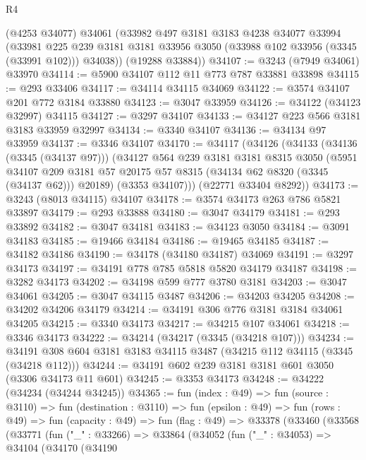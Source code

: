 \begin{lexlean}{R4}
\begin{coremodule}
      (@4253 @34077)
      @34061
      (@33982
        @497
        @3181
        @3183
        @4238
        @34077
        @33994
        (@33981
          @225
          @239
          @3181
          @3181
          @33956
          @3050
          (@33988 @102 @33956 (@3345 (@33991 @102)))
          @34038))
      (@19288 @33884))
@34107 := @3243 (@7949 @34061) @33970
@34114 := @5900 @34107 @112 @11 @773 @787 @33881 @33898
@34115 := @293 @33406
@34117 := @34114 @34115 @34069
@34122 := @3574 @34107 @201 @772 @3184 @33880
@34123 := @3047 @33959
@34126 := @34122 (@34123 @32997) @34115
@34127 := @3297 @34107
@34133 := @34127 @223 @566 @3181 @3183 @33959 @32997
@34134 := @3340 @34107
@34136 := @34134 @97 @33959
@34137 := @3346 @34107
@34170 := @34117
    (@34126
      (@34133
        (@34136 (@3345 (@34137 @97)))
        (@34127
          @564
          @239
          @3181
          @3181
          @8315
          @3050
          (@5951
            @34107
            @209
            @3181
            @57
            @20175
            @57
            @8315
            (@34134 @62 @8320 (@3345 (@34137 @62)))
            @20189)
          (@3353 @34107)))
      (@22771 @33404 @8292))
@34173 := @3243 (@8013 @34115) @34107
@34178 := @3574 @34173 @263 @786 @5821 @33897
@34179 := @293 @33888
@34180 := @3047 @34179
@34181 := @293 @33892
@34182 := @3047 @34181
@34183 := @34123 @3050
@34184 := @3091 @34183
@34185 := @19466 @34184
@34186 := @19465 @34185
@34187 := @34182 @34186
@34190 := @34178 (@34180 @34187) @34069
@34191 := @3297 @34173
@34197 := @34191 @778 @785 @5818 @5820 @34179 @34187
@34198 := @3282 @34173
@34202 := @34198 @599 @777 @3780 @3181
@34203 := @3047 @34061
@34205 := @3047 @34115 @3487
@34206 := @34203 @34205
@34208 := @34202 @34206 @34179
@34214 := @34191 @306 @776 @3181 @3184 @34061 @34205
@34215 := @3340 @34173
@34217 := @34215 @107 @34061
@34218 := @3346 @34173
@34222 := @34214 (@34217 (@3345 (@34218 @107)))
@34234 := @34191 @308 @604 @3181 @3183 @34115 @3487 (@34215 @112 @34115 (@3345 (@34218 @112)))
@34244 := @34191 @602 @239 @3181 @3181 @601 @3050 (@3306 @34173 @11 @601)
@34245 := @3353 @34173
@34248 := @34222 (@34234 (@34244 @34245))
@34365 := fun (index : @49) =>
  fun (source : @3110) =>
  fun (destination : @3110) =>
  fun (epsilon : @49) =>
  fun (rows : @49) =>
  fun (capacity : @49) =>
  fun (flag : @49) =>
  @33378
    (@33460
      (@33568
        (@33771
          (fun ("_" : @33266) =>
          @33864
            (@34052
              (fun ("_" : @34053) =>
              @34104
                (@34170
                  (@34190

\end{coremodule}
\end{lexlean}
